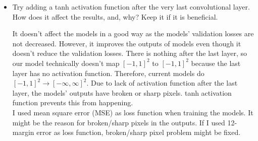 \documentclass[12pt]{article}
\begin{document}
\begin{itemize}
        \item Try adding a tanh activation function after the very last convolutional layer. How does it affect the results, and, why? Keep it if it is beneficial. 
        
		\begin{minipage}{.95\textwidth}
			\begin{minipage}{0.45\textwidth}
				\centering
				\captionsetup{width=1.\textwidth}
			\end{minipage}
			 \hfill
			\begin{minipage}{0.45\textwidth}
				It doesn't affect the models in a good way as the models' validation losses are not decreased. However, it improves the outputs of models even though it doesn't reduce the validation losses. There is nothing after the last layer, so our model technically doesn't map $[-1,1]^{2}$ to $[-1,1]^{2}$ because the last layer has no activation function. Therefore, current models do $[-1,1]^{2}\rightarrow[-\infty,\infty]^{2}$. Due to lack of activation function after the last layer, the models' outputs have broken or sharp pixels. tanh activation function prevents this from happening. \\
		 I used mean square error (MSE) as loss function when training the models. It might be the reason for broken/sharp pixels in the outputs. If I used 12-margin error as loss function, broken/sharp pixel problem might be fixed.
			\end{minipage}
		\end{minipage} \\        
        

\end{itemize}
\end{document}

